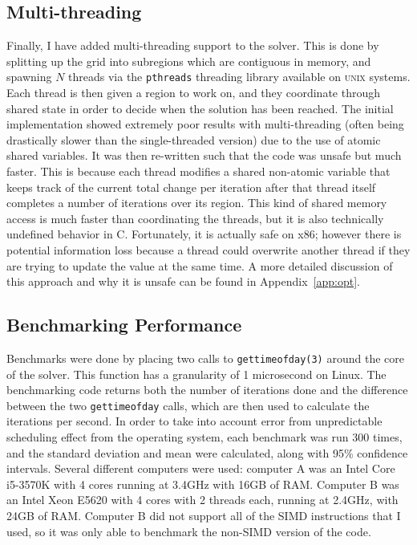 \subsection{Multi-threading}
Finally, I have added multi-threading support to the solver. This is done by splitting up the grid into subregions which
are contiguous in memory, and spawning $N$ threads via the \texttt{pthreads} threading library available on \textsc{unix} systems. Each thread is then given a region to work on,
and they coordinate through shared state in order to decide when the solution has been reached. The initial implementation
showed extremely poor results with multi-threading (often being drastically slower than the single-threaded version)
due to the use of atomic shared variables. It was then re-written such that the code was unsafe but much faster. This
is because each thread modifies a shared non-atomic variable that keeps track of the current total change per iteration
after that thread itself completes a number of iterations over its region. This kind of shared memory access is much faster
than coordinating the threads, but it is also technically undefined behavior in C. Fortunately, it is actually
safe on x86; however there is potential information loss because a thread could overwrite another thread if they are trying to
update the value at the same time. A more detailed discussion of this approach and why it is unsafe can be found in Appendix~\ref{app:opt}.


















\subsection{Benchmarking Performance}
Benchmarks were done by placing two calls to \texttt{gettimeofday(3)} around the core of the solver. This function has a
granularity of 1 microsecond on Linux\cite{gtod}. The benchmarking code returns
both the number of iterations done and the difference between the two \texttt{gettimeofday} calls, which are then used to calculate
the iterations per second. In order to take into account error from unpredictable scheduling effect from the operating system,
each benchmark was run 300 times, and the standard deviation and mean were calculated, along with 95\% confidence intervals. Several different computers were used:
computer A was an Intel Core i5-3570K with 4 cores running at 3.4GHz with 16GB of RAM. Computer B was an Intel Xeon E5620
with 4 cores with 2 threads each, running at 2.4GHz, with 24GB of RAM. Computer B did not support all of the SIMD instructions
that I used, so it was only able to benchmark the non-SIMD version of the code.

